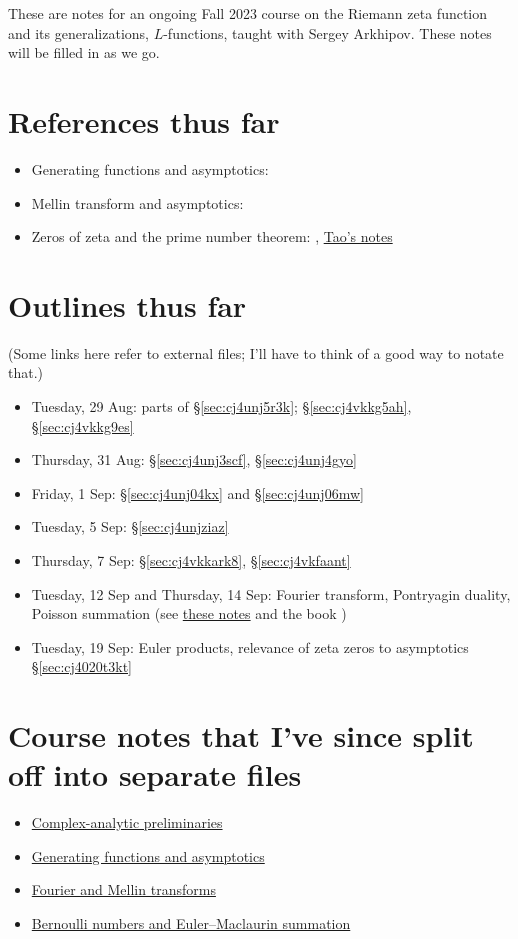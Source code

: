 \documentclass[reqno]{amsart}  \numberwithin{theorem}{section} \numberwithin{equation}{section}
\begin{document}
 
These are notes for an ongoing Fall 2023 course on the Riemann zeta function and its generalizations, $L$-functions, taught with Sergey Arkhipov.  These notes will be filled in as we go.

\section{References thus far}
\begin{itemize}
\item Generating functions and asymptotics: \cite[\S5.2]{MR2172781}
\item Mellin transform and asymptotics: \cite{zagier-mellin}
\item Zeros of zeta and the prime number theorem: \cite{Dav80}, \href{https://terrytao.wordpress.com/2014/12/09/254a-notes-2-complex-analytic-multiplicative-number-theory/}{Tao's notes}
\end{itemize}

\section{Outlines thus far}
(Some links here refer to external files; I'll have to think of a good way to notate that.)
\begin{itemize}
\item Tuesday, 29 Aug: parts of \S\ref{sec:cj4unj5r3k}; \S\ref{sec:cj4vkkg5ah}, \S\ref{sec:cj4vkkg9es}
\item Thursday, 31 Aug: \S\ref{sec:cj4unj3scf}, \S\ref{sec:cj4unj4gyo}
\item Friday, 1 Sep: \S\ref{sec:cj4unj04kx} and \S\ref{sec:cj4unj06mw}
\item Tuesday, 5 Sep: \S\ref{sec:cj4unjziaz}
\item Thursday, 7 Sep: \S\ref{sec:cj4vkkark8}, \S\ref{sec:cj4vkfaant}
\item Tuesday, 12 Sep and Thursday, 14 Sep: Fourier transform, Pontryagin duality, Poisson summation (see \href{20230919T144827--discrete-fourier-transform.pdf}{these notes} and the book \cite{MR3289059})
\item Tuesday, 19 Sep: Euler products, relevance of zeta zeros to asymptotics \S\ref{sec:cj4020t3kt}
\end{itemize}


\section{Course notes that I've since split off into separate files}
\begin{itemize}
\item \href{20230907T143521--complex-analysis-preliminaries.pdf}{Complex-analytic preliminaries}
\item \href{20230907T142550--generating-functions-asymptotics.pdf}{Generating functions and asymptotics}
\item \href{20230907T143130--fourier-and-mellin-transforms.pdf}{Fourier and Mellin transforms}
\item \href{20230907T144219--bernoulli-numbers-euler-maclaurin.pdf}{Bernoulli numbers and Euler--Maclaurin summation}
\end{itemize}
\end{document}
